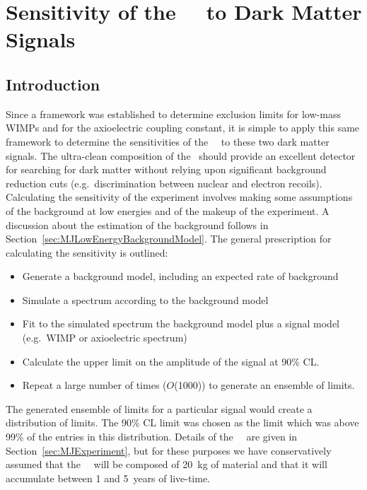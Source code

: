 	\section{Sensitivity of the \MJ~\minmod~to Dark Matter Signals}
	\label{sec:MJSensitivity}
	
		\subsection{Introduction}
		\label{sec:MJSensitivityIntro}
	Since a framework was established to determine exclusion limits for low-mass WIMPs and for the axioelectric coupling constant, it is simple to apply this same framework to determine the sensitivities of the \MJ~\minmod~to these two dark matter signals.  The ultra-clean composition of the \minmod~should provide an excellent detector for searching for dark matter without relying upon significant background reduction cuts (e.g.~discrimination between nuclear and electron recoils).  Calculating the sensitivity of the experiment involves making some assumptions of the background at low energies and of the makeup of the experiment.  A discussion about the estimation of the background follows in Section~\ref{sec:MJLowEnergyBackgroundModel}.  The general prescription for calculating the sensitivity is outlined:
	
		\begin{itemize}
			\item Generate a background model, including an expected rate of background
			\item Simulate a spectrum according to the background model
			\item Fit to the simulated spectrum the background model plus a signal model (e.g.~WIMP or axioelectric spectrum)
			\item Calculate the upper limit on the amplitude of the signal at 90\% CL.
			\item Repeat a large number of times ($O$(1000)) to generate an ensemble of limits.
		\end{itemize}	
		
The generated ensemble of limits for a particular signal would create a distribution of limits.  The 90\% CL limit was chosen as the limit which was above 99\% of the entries in this distribution.  Details of the \MJ~\minmod~are given in Section~\ref{sec:MJExperiment}, but for these purposes we have conservatively assumed that the \MJ~\minmod~will be composed of 20~kg of material and that it will accumulate between 1 and 5~years of live-time.  
	
